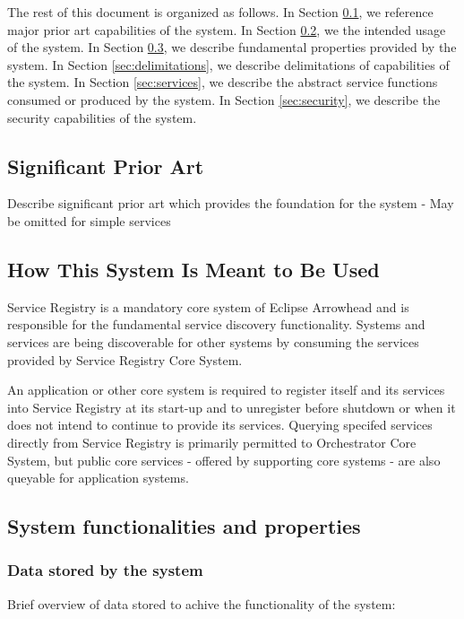 \documentclass[a4paper]{arrowhead}
\begin{document}
The rest of this document is organized as follows.
In Section \ref{sec:prior_art}, we reference major prior art capabilities
of the system.
In Section \ref{sec:use}, we the intended usage of the system.
In Section \ref{sec:properties}, we describe fundamental properties
provided by the system.
In Section \ref{sec:delimitations}, we describe delimitations of capabilities
of the system.
In Section \ref{sec:services}, we describe the abstract service
functions consumed or produced by the system.
In Section \ref{sec:security}, we describe the security capabilities
of the system.

\newpage

\subsection{Significant Prior Art}
\label{sec:prior_art}

\color{red}
Describe significant prior art which provides the
foundation for the system - May be omitted for simple services
\color{black}  

\subsection{How This System Is Meant to Be Used}
\label{sec:use}

Service Registry is a mandatory core system of Eclipse Arrowhead and is responsible for the fundamental service discovery functionality. Systems and services are being discoverable for other systems by consuming the services provided by Service Registry Core System.

An application or other core system is required to register itself and its services into Service Registry at its start-up and to unregister before shutdown or when it does not intend to continue to provide its services. Querying specifed services directly from Service Registry is primarily permitted to Orchestrator Core System, but public core services - offered by supporting core systems - are also queyable for application systems. 

\subsection{System functionalities and properties}
\label{sec:properties}

\subsubsection {Data stored by the system}
Brief overview of data stored to achive the functionality of the system:
\end{document}
